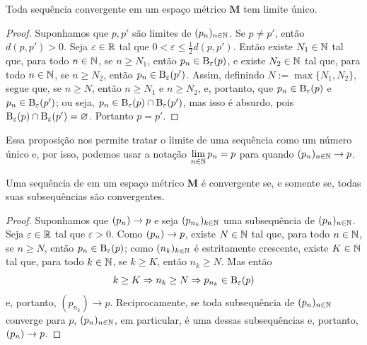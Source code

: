 \begin{coro}
Toda sequência convergente em um espaço métrico $\bm M$ tem limite único.
\end{coro}
\begin{proof}
Suponhamos que $p,p'$ são limites de $(p_n)_{n \in \mathbb{N}}$. Se $p \neq p'$, então $d(p,p')>0$. Seja $\varepsilon \in \mathbb{R}$ tal que $0 < \varepsilon \leq \frac{1}{2} d(p,p')$. Então existe $N_1 \in \mathbb{N}$ tal que, para todo $n \in \mathbb{N}$, se $n \geq N_1$, então $p_n \in \mathrm{B}_\varepsilon(p)$, e existe $N_2 \in \mathbb{N}$ tal que, para todo $n \in \mathbb{N}$, se $n \geq N_2$, então $p_n \in \mathrm{B}_\varepsilon(p')$. Assim, definindo $N := \max \{N_1,N_2\}$, segue que, se $n \geq N$, então $n \geq N_1$ e $n \geq N_2$, e, portanto, que $p_n \in \mathrm{B}_\varepsilon(p)$ e $p_n \in \mathrm{B}_\varepsilon(p')$; ou seja, $p_n \in \mathrm{B}_\varepsilon(p) \cap \mathrm{B}_\varepsilon(p')$, mas isso é absurdo, pois $\mathrm{B}_\varepsilon(p) \cap \mathrm{B}_\varepsilon(p')=\varnothing$. Portanto $p=p'$.
\end{proof}

Essa proposição nos permite tratar o limite de uma sequência como um número único e, por isso, podemos usar a notação $\displaystyle\lim_{n \in \mathbb{N}} p_n = p$ para quando $(p_n)_{n \in \mathbb{N}} \rightarrow p$.

\begin{prop}
Uma sequência de em um espaço métrico $\bm M$ é convergente se, e somente se, todas suas subsequências são convergentes.
\end{prop}
\begin{proof}
	Suponhamos que $(p_n) \rightarrow p$ e seja $(p_{n_k})_{k \in \mathbb{N}}$ uma subsequência de $(p_n)_{n \in \mathbb{N}}$. Seja $\varepsilon \in \mathbb{R}$ tal que $\varepsilon > 0$. Como $(p_n) \rightarrow p$, existe $N \in \mathbb{N}$ tal que, para todo $n \in \mathbb{N}$, se $n \geq N$, então $p_n \in \mathrm{B}_\varepsilon(p)$; como $(n_k)_{k \in \mathbb{N}}$ é estritamente crescente, existe $K \in \mathbb{N}$ tal que, para todo $k \in \mathbb{N}$, se $k \geq K$, então $n_k \geq N$. Mas então
	\begin{equation*}
	k \geq K \Rightarrow n_k \geq N \Rightarrow p_{n_k} \in \mathrm{B}_\varepsilon(p)
	\end{equation*}
e, portanto, $(p_{n_k}) \to p$.	Reciprocamente, se toda subsequência de $(p_n)_{n \in \mathbb{N}}$ converge para $p$, $(p_n)_{n \in \mathbb{N}}$, em particular, é uma dessas subsequências e, portanto, $(p_n) \rightarrow p$.
\end{proof}

